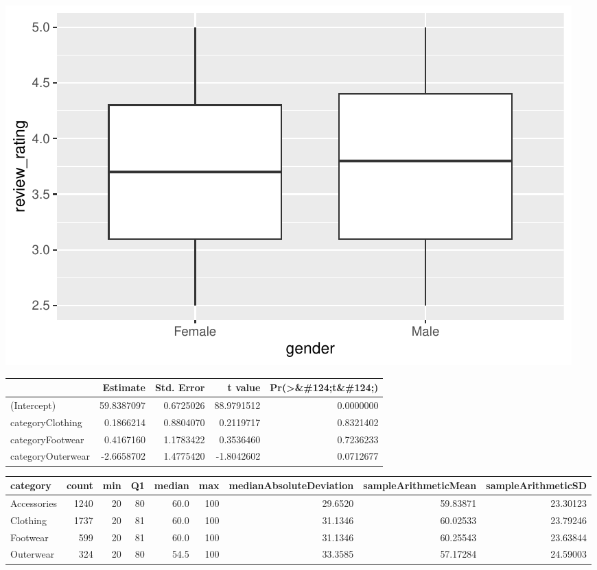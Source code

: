 \documentclass[
  letterpaper,
  DIV=11,
  numbers=noendperiod]{scrartcl}
\begin{document}
\includegraphics{Quarto-Stat-184-Final-Project_files/figure-pdf/vizualization_for_gender_review-1.pdf}

\begin{longtable*}[t]{lrrrr}
\toprule
 & Estimate & Std. Error & t value & Pr(>\&\#124;t\&\#124;)\\
\midrule
(Intercept) & 59.8387097 & 0.6725026 & 88.9791512 & 0.0000000\\
categoryClothing & 0.1866214 & 0.8804070 & 0.2119717 & 0.8321402\\
categoryFootwear & 0.4167160 & 1.1783422 & 0.3536460 & 0.7236233\\
categoryOuterwear & -2.6658702 & 1.4775420 & -1.8042602 & 0.0712677\\
\bottomrule
\end{longtable*}

\begin{longtable*}[t]{lrrrrrrrr}
\toprule
category & count & min & Q1 & median & max & medianAbsoluteDeviation & sampleArithmeticMean & sampleArithmeticSD\\
\midrule
Accessories & 1240 & 20 & 80 & 60.0 & 100 & 29.6520 & 59.83871 & 23.30123\\
Clothing & 1737 & 20 & 81 & 60.0 & 100 & 31.1346 & 60.02533 & 23.79246\\
Footwear & 599 & 20 & 81 & 60.0 & 100 & 31.1346 & 60.25543 & 23.63844\\
Outerwear & 324 & 20 & 80 & 54.5 & 100 & 33.3585 & 57.17284 & 24.59003\\
\bottomrule
\end{longtable*}
\end{document}
